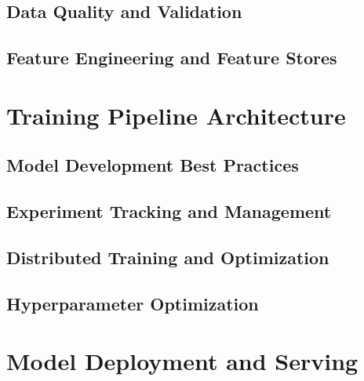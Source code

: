 \documentclass[12pt,a4paper]{book}
\theoremstyle{definition}
\theoremstyle{plain}
\theoremstyle{remark}
\begin{document}
\chapter{Data Quality and Validation}
\label{ch:data_quality}


\chapter{Feature Engineering and Feature Stores}
\label{ch:feature_stores}


\part{Training Pipeline Architecture}

\chapter{Model Development Best Practices}
\label{ch:model_development}


\chapter{Experiment Tracking and Management}
\label{ch:experiment_tracking}


\chapter{Distributed Training and Optimization}
\label{ch:distributed_training}


\chapter{Hyperparameter Optimization}
\label{ch:hyperparameter_optimization}


\part{Model Deployment and Serving}
\end{document}
